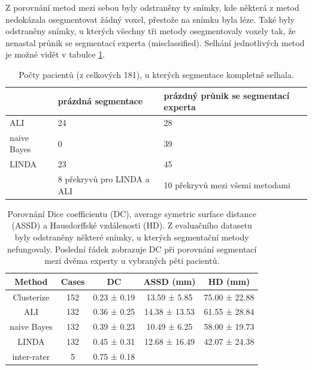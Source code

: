 \documentclass[11pt]{article}
\begin{document}
Z porovnání metod mezi sebou byly odstraněny ty snímky, kde některá z metod nedokázala osegmentovat žádný voxel, přestože na snímku byla léze. Také byly odstraněny snímky, u kterých všechny tři metody osegmentovaly voxely tak, že nenastal průnik se segmentací experta (misclassified). Selhání jednotlivých metod je možné vidět v tabulce \ref{tbl-t1w-misclassified}.
\begin{table}[htp]
	\centering
	\begin{tabular}{lp{5cm}p{5cm}}
		& \textbf{prázdná segmentace} & \textbf{prázdný průnik se segmentací experta} \\ \hline
		ALI         & 24                          & 28                                            \\ \hline
		naive Bayes & 0                           & 39                                            \\ \hline
		LINDA       & 23                          & 45                                            \\ \hline
		& 8 překryvů pro LINDA a ALI  & 10 překryvů mezi všemi metodami               \\ \hline
	\end{tabular}
	\caption{Počty pacientů (z celkových 181), u kterých segmentace kompletně selhala.}
	\label{tbl-t1w-misclassified}
\end{table}
\begin{table}[htp]
	\centering
	\begin{tabular}{ccccc}
		\textbf{Method} & \textbf{Cases} & \textbf{DC} & \textbf{ASSD (mm)} & \textbf{HD (mm)} \\ \hline
		Clusterize      & 152            & 0.23 ± 0.19 & 13.59 ± 5.85       & 75.00 ± 22.88    \\ \hline
		ALI             & 132            & 0.36 ± 0.25 & 14.38 ± 13.53      & 61.55 ± 28.84    \\ \hline
		naive Bayes     & 132            & 0.39 ± 0.23 & 10.49 ± 6.25       & 58.00 ± 19.73    \\ \hline
		LINDA           & 132            & 0.45 ± 0.31 & 12.68 ± 16.49      & 42.07 ± 24.38    \\ \hline
		inter-rater     & 5              & 0.75 ± 0.18 &                    &                  \\ \hline
	\end{tabular}
	\caption{Porovnání Dice coefficientu (DC), average symetric surface distance (ASSD) a Hausdorffské vzdálenosti (HD). Z evaluačního datasetu byly odstraněny některé snímky, u kterých segmentační metody nefungovaly. Poslední řádek zobrazuje DC při porovnání segmentací mezi dvěma experty u vybraných pěti pacientů.}
	\label{tbl-t1w-results}
\end{table}
\end{document}
